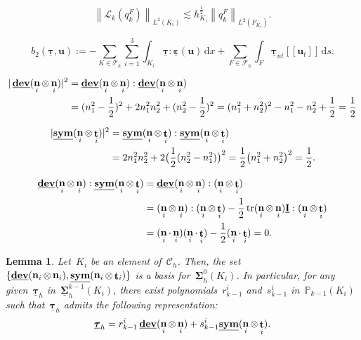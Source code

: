 \documentclass[10pt,a4paper]{amsart}
\newtheorem{lemma}{Lemma}
\newcommand{\Ccalh}{\mathcal{C}_h}
\newcommand{\F}{F}
\newcommand{\Fcalh}{\mathcal{F}_h}
\newcommand{\Fi}{{\F_{\Ki}}}
\newcommand{\Idbf}{\underline{\mathbf{I}}}
\newcommand{\K}{K}
\newcommand{\Ki}{{\K_i}}
\newcommand{\Lcalk}{\mathcal{L}_k}
\newcommand{\Ltwo}{L^2}
\newcommand{\Norm}[1]{{\left\|{#1} \right\|}}
\newcommand{\Pbbkmo}{\mathbb{P}_{k-1}}
\newcommand{\Sigmah}{\underline{\boldsymbol{\Sigma}}_h}
\newcommand{\Sigmahkmo}{\Sigmah^{k-1}}
\newcommand{\Sigmahz}{\Sigmah^0}
\newcommand{\Tauh}{\mathcal{T}_h}
\newcommand{\btwo}{b_2}
\DeclareMathOperator{\dev}{\underline{\mathbf{dev}}}
\newcommand{\ds}{\, \mathrm{d}s}
\newcommand{\dx}{\, \mathrm{d}x}
\newcommand{\epsbfun}{\underline{\boldsymbol{\varepsilon}}}
\newcommand{\hKi}{h_{\Ki}}
\newcommand{\jump}[1]{\left[\!\left[#1\right]\!\right]}
\newcommand{\ncompo}{n_1}
\newcommand{\ncompt}{n_2}
\DeclareMathOperator{\norm}{\bf{n}}
\newcommand{\normi}{\norm_i}
\newcommand{\normtang}{{nt}}
\newcommand{\qkF}{q^\F_{k}}
\newcommand{\rkmoi}{r_{k-1}^i}
\newcommand{\skmoi}{s_{k-1}^i}
\newcommand{\sym}{\underline{\bf{sym}}}
\DeclareMathOperator{\tang}{\bf{t}}
\newcommand{\tangi}{\tang_i}
\newcommand{\taubf}{\underline{\boldsymbol{\tau}}}
\newcommand{\taubfh}{\underline{\boldsymbol{\tau}}_h}
\DeclareMathOperator{\tr}{tr}
\newcommand{\ubf}{\mathbf{u}}
\begin{document}
\begin{equation} \label{stability-Lcal}
\Norm{\Lcalk(\qkF)}_{\Ltwo(\Ki)}
\lesssim \hKi^{\frac12} \Norm{\qkF}_{\Ltwo(\Fi)}.
\end{equation}

\begin{equation} \label{btwo}
\btwo(\taubf,\ubf)
:= - \sum_{\K \in \Tauh} \sum_{i=1}^3 \int_{\Ki} \taubf : \epsbfun(\ubf)\dx 
+ \sum_{\F \in \Fcalh} \int_{\F} \taubf_{\normtang} \jump{\ubf_t} \ds.
\end{equation}

\begin{equation} \label{dev:frob-norm}
\begin{split}
|\dev(\normi\otimes\normi)|^2
&= \dev(\normi\otimes\normi):\dev(\normi\otimes\normi) \\
&=  (\ncompo^2 - \frac12)^2 + 2\ncompo^2\ncompt^2 + (\ncompt^2 - \frac12)^2
=  (\ncompo^2 + \ncompt^2)^2 - \ncompo^2 - \ncompt^2 + \frac12 = \frac12 
\end{split}
\end{equation}

\begin{equation} \label{sym:frob-norm}
\begin{split}
|\sym(\normi\otimes\tangi)|^2
&=\sym(\normi\otimes\tangi):\sym(\normi\otimes\tangi) \\
&=  2\ncompo^2\ncompt^2 + 2 \big(\frac12 (\ncompt^2 -\ncompo^2)\big)^2   
=  \frac12\big(\ncompo^2 + \ncompt^2\big)^2 = \frac12.
\end{split}
\end{equation}

\begin{equation} \label{orthogonality:dev-sym}
\begin{split}
\dev(\normi\otimes\normi) : \sym(\normi\otimes\tangi)
&= \dev(\normi\otimes\normi) : (\normi\otimes\tangi) \\
&= (\normi\otimes\normi) : (\normi\otimes\tangi)
    - \frac{1}{2}\tr(\normi\otimes\normi)\Idbf:(\normi\otimes\tangi) \\
&= (\normi\cdot\normi)(\normi\cdot \tangi) - \frac{1}{2}(\normi\cdot \tangi)
= 0.
\end{split}
\end{equation}

\begin{lemma} \label{lemma:dev-sym-basis-Ki}
Let~$\Ki$ be an element of~$\Ccalh$.
Then,
the set $\{\dev(\normi\otimes\normi),\sym(\normi\otimes\tangi)\}$
is a basis for~$\Sigmahz(\Ki)$.
In particular,
for any given~$\taubfh$ in~$\Sigmahkmo(\Ki)$,
there exist polynomials~$\rkmoi$ and~$\skmoi$ in~$\Pbbkmo(\Ki)$
such that~$\taubfh$ admits the following representation:
\begin{equation*}
\taubfh = \rkmoi\dev(\normi\otimes\normi) + \skmoi\sym(\normi\otimes\tangi).
\end{equation*}
\end{lemma}
\end{document}
